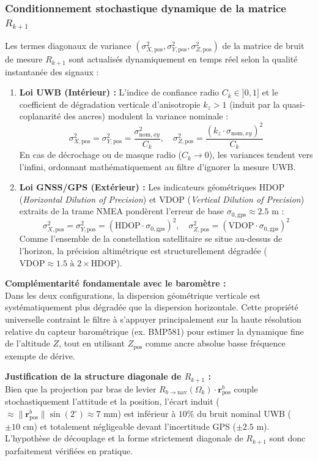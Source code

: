 \documentclass[../Formulations_Kalman.tex]{subfiles}
\begin{document}
\subsubsection{Conditionnement stochastique dynamique de la matrice $R_{k+1}$}
Les termes diagonaux de variance $(\sigma_{X,\text{pos}}^2, \sigma_{Y,\text{pos}}^2, \sigma_{Z,\text{pos}}^2)$ de la matrice de bruit de mesure $R_{k+1}$ sont actualisés dynamiquement en temps réel selon la qualité instantanée des signaux :
\begin{enumerate}
    \item \textbf{Loi UWB (Intérieur) :} L'indice de confiance radio $C_k \in ]0, 1]$ et le coefficient de dégradation verticale d'anisotropie $k_z > 1$ (induit par la quasi-coplanarité des ancres) modulent la variance nominale :
    \begin{equation}
    \sigma_{X,\text{pos}}^2 = \sigma_{Y,\text{pos}}^2 = \frac{\sigma_{\text{nom},xy}^2}{C_k}, \quad \sigma_{Z,\text{pos}}^2 = \frac{(k_z \cdot \sigma_{\text{nom},xy})^2}{C_k}
    \end{equation}
    En cas de décrochage ou de masque radio ($C_k \to 0$), les variances tendent vers l'infini, ordonnant mathématiquement au filtre d'ignorer la mesure UWB.
    
    \item \textbf{Loi GNSS/GPS (Extérieur) :} Les indicateurs géométriques HDOP (\textit{Horizontal Dilution of Precision}) et VDOP (\textit{Vertical Dilution of Precision}) extraits de la trame NMEA pondèrent l'erreur de base $\sigma_{0,\text{gps}} \approx 2.5\text{ m}$ :
    \begin{equation}
    \sigma_{X,\text{pos}}^2 = \sigma_{Y,\text{pos}}^2 = (\text{HDOP} \cdot \sigma_{0,\text{gps}})^2, \quad \sigma_{Z,\text{pos}}^2 = (\text{VDOP} \cdot \sigma_{0,\text{gps}})^2
    \end{equation}
    Comme l'ensemble de la constellation satellitaire se situe au-dessus de l'horizon, la précision altimétrique est structurellement dégradée ($\text{VDOP} \approx 1.5 \text{ à } 2 \times \text{HDOP}$).
\end{enumerate}

\textbf{Complémentarité fondamentale avec le baromètre :} \\
Dans les deux configurations, la dispersion géométrique verticale est systématiquement plus dégradée que la dispersion horizontale. Cette propriété universelle contraint le filtre à s'appuyer principalement sur la haute résolution relative du capteur barométrique (ex. BMP581) pour estimer la dynamique fine de l'altitude $Z$, tout en utilisant $Z_{\text{pos}}$ comme ancre absolue basse fréquence exempte de dérive.

\textbf{Justification de la structure diagonale de $R_{k+1}$ :} \\
Bien que la projection par bras de levier $R_{b \to \text{nav}}(\Omega_k) \cdot \mathbf{r}_{\text{pos}}^b$ couple stochastiquement l'attitude et la position, l'écart induit ($\approx \|\mathbf{r}_{\text{pos}}^b\| \sin(2^\circ) \approx 7\text{ mm}$) est inférieur à $10\%$ du bruit nominal UWB ($\pm 10\text{ cm}$) et totalement négligeable devant l'incertitude GPS ($\pm 2.5\text{ m}$). L'hypothèse de découplage et la forme strictement diagonale de $R_{k+1}$ sont donc parfaitement vérifiées en pratique.
\end{document}
